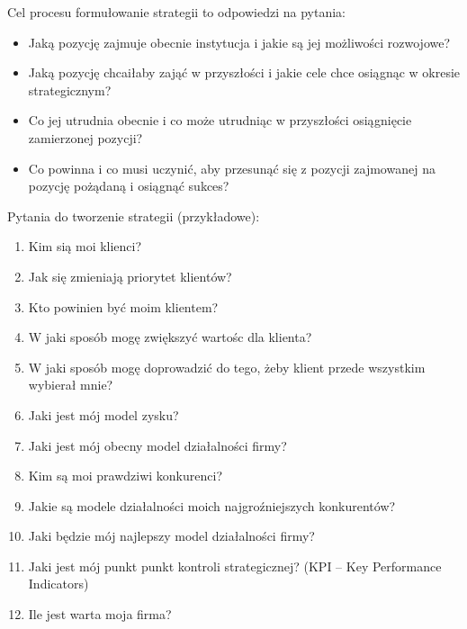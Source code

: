 \documentclass[a4paper,10pt]{report}
\begin{document}
Cel procesu formułowanie strategii to odpowiedzi na pytania:
\begin{itemize}
	\item Jaką pozycję zajmuje obecnie instytucja i jakie są jej możliwości rozwojowe?
	\item Jaką pozycję chcaiłaby zająć w przyszłości i jakie cele chce osiągnąc w okresie strategicznym?
	\item Co jej utrudnia obecnie i co może utrudniąc w przyszłości osiągnięcie zamierzonej pozycji?
	\item Co powinna i co musi uczynić, aby przesunąć się z pozycji zajmowanej na pozycję pożądaną i osiągnąć sukces?
\end{itemize}

Pytania do tworzenie strategii (przykładowe):
\begin{enumerate}
	\item Kim sią moi klienci?
	\item Jak się zmieniają priorytet klientów?	
	\item Kto powinien być moim klientem?
	\item W jaki sposób mogę zwiększyć wartośc dla klienta?
	\item W jaki sposób mogę doprowadzić do tego, żeby klient przede wszystkim wybierał mnie?
	\item Jaki jest mój model zysku?
	\item Jaki jest mój obecny model działalności firmy?
	\item Kim są moi prawdziwi konkurenci?
	\item Jakie są modele działalności moich najgroźniejszych konkurentów?
	\item Jaki będzie mój najlepszy model działalności firmy?
	\item Jaki jest mój punkt punkt kontroli strategicznej? (KPI -- Key Performance Indicators)
	\item Ile jest warta moja firma?
\end{enumerate}
\end{document}
